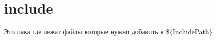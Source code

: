 \chapter{include}
\hypertarget{md__c_1_2_users_2yyari_2_documents_2_kolibri_o_s_2_kolibri_o_s-_cpp-_lib_2include_2_readme}{}\label{md__c_1_2_users_2yyari_2_documents_2_kolibri_o_s_2_kolibri_o_s-_cpp-_lib_2include_2_readme}
\label{md__c_1_2_users_2yyari_2_documents_2_kolibri_o_s_2_kolibri_o_s-_cpp-_lib_2include_2_readme_autotoc_md2}%
%
 Это пака где лежат файлы которые нужно добавить в \$\{Include\+Path\} 